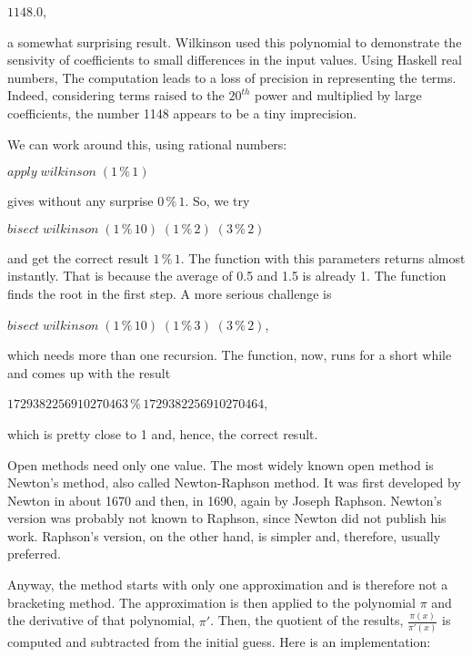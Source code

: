 \documentclass[tikz]{scrreprt}
\newcommand{\Varid}[1]{\mathit{#1}}
\begin{document}
\ensuremath{\mathrm{1148.0}},

a somewhat surprising result.
Wilkinson used this polynomial to demonstrate
the sensivity of coefficients to small differences
in the input values. Using Haskell real numbers,
The computation leads to a loss of precision
in representing the terms. Indeed, considering
terms raised to the $20^{th}$ power and multiplied
by large coefficients, the number 1148 appears to
be a tiny imprecision.

We can work around this, using rational numbers:

\ensuremath{\Varid{apply}\;\Varid{wilkinson}\;(\mathrm{1}\mathbin{\%}\mathrm{1})}

gives without any surprise \ensuremath{\mathrm{0}\mathbin{\%}\mathrm{1}}.
So, we try

\ensuremath{\Varid{bisect}\;\Varid{wilkinson}\;(\mathrm{1}\mathbin{\%}\mathrm{10})\;(\mathrm{1}\mathbin{\%}\mathrm{2})\;(\mathrm{3}\mathbin{\%}\mathrm{2})}

and get the correct result \ensuremath{\mathrm{1}\mathbin{\%}\mathrm{1}}.
The function with this parameters
returns almost instantly. That is
because the average of 0.5 and 1.5 is already 1.
The function finds the root in the first step.
A more serious challenge is

\ensuremath{\Varid{bisect}\;\Varid{wilkinson}\;(\mathrm{1}\mathbin{\%}\mathrm{10})\;(\mathrm{1}\mathbin{\%}\mathrm{3})\;(\mathrm{3}\mathbin{\%}\mathrm{2})},

which needs more than one recursion.
The function, now, runs for a short while and
comes up with the result

\ensuremath{\mathrm{1729382256910270463}\mathbin{\%}\mathrm{1729382256910270464}},

which is pretty close to 1 and, hence,
the correct result.

Open methods need only one value.
The most widely known open method is Newton's method,
also called Newton-Raphson method.
It was first developed by Newton in about 1670
and then, in 1690, again by Joseph Raphson.
Newton's version was probably not known to Raphson,
since Newton did not publish his work.
Raphson's version, on the other hand, is
simpler and, therefore, usually preferred.

Anyway, the method starts with only one approximation
and is therefore not a bracketing method.
The approximation is then applied to the polynomial $\pi$
and the derivative of that polynomial, $\pi'$.
Then, the quotient of the results, $\frac{\pi(x)}{\pi'(x)}$ 
is computed and subtracted from the initial guess.
Here is an implementation:
\end{document}
